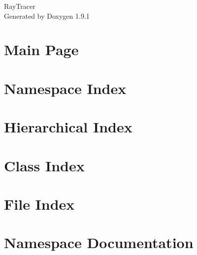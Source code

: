 \let\mypdfximage\pdfximage\def\pdfximage{\immediate\mypdfximage}\documentclass[twoside]{book}
\newcommand{\+}{\discretionary{\mbox{\scriptsize$\hookleftarrow$}}{}{}}
\newcommand{\clearemptydoublepage}{%
  \newpage{\pagestyle{empty}\cleardoublepage}%
}
\begin{document}
\raggedbottom

\hypersetup{pageanchor=false,
             bookmarksnumbered=true,
             pdfencoding=unicode
            }
\begin{titlepage}
\vspace*{7cm}
\begin{center}%
{\Large Ray\+Tracer }\\
\vspace*{1cm}
{\large Generated by Doxygen 1.9.1}\\
\end{center}
\end{titlepage}
\clearemptydoublepage
{}
\tableofcontents
\clearemptydoublepage
{}
\hypersetup{pageanchor=true}

\chapter{Main Page}
\label{index}\hypertarget{index}{}
\chapter{Namespace Index}

\chapter{Hierarchical Index}

\chapter{Class Index}

\chapter{File Index}

\chapter{Namespace Documentation}







































\end{document}
